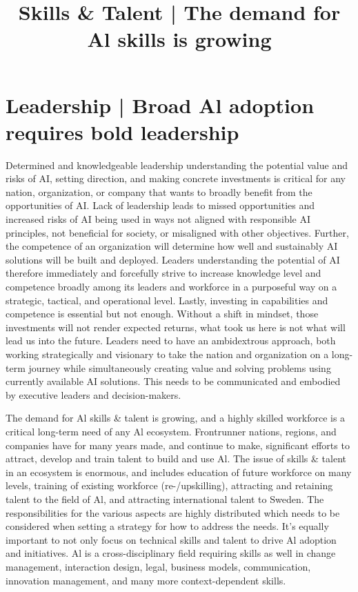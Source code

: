 \section*{Leadership | Broad Al adoption requires bold leadership}
Determined and knowledgeable leadership understanding the potential value and risks of AI, setting direction, and making concrete investments is critical for any nation, organization, or company that wants to broadly benefit from the opportunities of AI. Lack of leadership leads to missed opportunities and increased risks of AI being used in ways not aligned with responsible AI principles, not beneficial for society, or misaligned with other objectives.
Further, the competence of an organization will determine how well and sustainably AI solutions will be built and deployed. Leaders understanding the potential of AI therefore immediately and forcefully strive to increase knowledge level and competence broadly among its leaders and workforce in a purposeful way on a strategic, tactical, and operational level.
Lastly, investing in capabilities and competence is essential but not enough. Without a shift in mindset, those investments will not render expected returns, what took us here is not what will lead us into the future. Leaders need to have an ambidextrous approach, both working strategically and visionary to take the nation and organization on a long-term journey while simultaneously creating value and solving problems using currently available AI solutions. This needs to be communicated and embodied by executive leaders and decision-makers.

\title{
Skills \& Talent | The demand for Al skills is growing
}
The demand for Al skills \& talent is growing, and a highly skilled workforce is a critical long-term need of any Al ecosystem. Frontrunner nations, regions, and companies have for many years made, and continue to make, significant efforts to attract, develop and train talent to build and use Al.
The issue of skills \& talent in an ecosystem is enormous, and includes education of future workforce on many levels, training of existing workforce (re-/upskilling), attracting and retaining talent to the field of Al, and attracting international talent to Sweden. The responsibilities for the various aspects are highly distributed which needs to be considered when setting a strategy for how to address the needs.
It's equally important to not only focus on technical skills and talent to drive Al adoption and initiatives. Al is a cross-disciplinary field requiring skills as well in change management, interaction design, legal, business models, communication, innovation management, and many more context-dependent skills.

